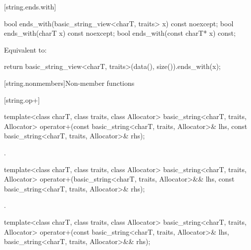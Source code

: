[string.ends.with]{}

%
\begin{itemdecl}
bool ends_with(basic_string_view<charT, traits> x) const noexcept;
bool ends_with(charT x) const noexcept;
bool ends_with(const charT* x) const;
\end{itemdecl}

\begin{itemdescr}
\pnum
\effects
Equivalent to:
\begin{codeblock}
return basic_string_view<charT, traits>(data(), size()).ends_with(x);
\end{codeblock}
\end{itemdescr}

[string.nonmembers]{Non-member functions}


[string.op+]{}

%
\begin{itemdecl}
template<class charT, class traits, class Allocator>
  basic_string<charT, traits, Allocator>
    operator+(const basic_string<charT, traits, Allocator>& lhs,
              const basic_string<charT, traits, Allocator>& rhs);
\end{itemdecl}

\begin{itemdescr}
\pnum
\returns
{}.
\end{itemdescr}

%
\begin{itemdecl}
template<class charT, class traits, class Allocator>
  basic_string<charT, traits, Allocator>
    operator+(basic_string<charT, traits, Allocator>&& lhs,
              const basic_string<charT, traits, Allocator>& rhs);
\end{itemdecl}

\begin{itemdescr}
\pnum
\returns
{}.
\end{itemdescr}

%
\begin{itemdecl}
template<class charT, class traits, class Allocator>
  basic_string<charT, traits, Allocator>
    operator+(const basic_string<charT, traits, Allocator>& lhs,
              basic_string<charT, traits, Allocator>&& rhs);
\end{itemdecl}

